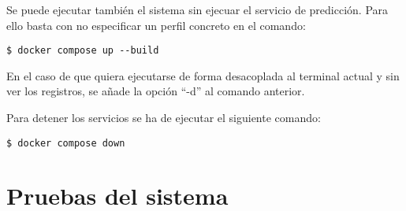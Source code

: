 Se puede ejecutar también el sistema sin ejecuar el servicio de predicción. Para ello basta con no especificar 
un perfil concreto en el comando:
\begin{lstlisting}
$ docker compose up --build
\end{lstlisting}

En el caso de que quiera ejecutarse de forma desacoplada al terminal actual y sin ver los registros, se añade 
la opción ``-d'' al comando anterior.

Para detener los servicios se ha de ejecutar el siguiente comando:
\begin{lstlisting}
$ docker compose down
\end{lstlisting}

\section{Pruebas del sistema}

